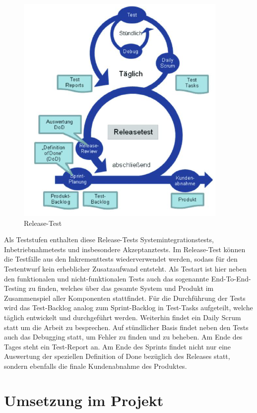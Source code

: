 \begin{figure}[!htb]
    \centering
    \includegraphics[width=.8\textwidth]{figures/rebecca/Release_Test.png}
    \caption[]{Release-Test}
    \label{fig:ReleaseTest}
\end{figure}

Als Teststufen enthalten diese Release-Tests Systemintegrationstests, Inbetriebnahmetests und insbesondere Akzeptanztests. Im Release-Test können die Testfälle aus den Inkrementtests wiederverwendet werden, sodass für den Testentwurf kein erheblicher Zusatzaufwand entsteht. Als Testart ist hier neben den funktionalen und nicht-funktionalen Tests auch das sogenannte End-To-End-Testing zu finden, welches über das gesamte System und Produkt im Zusammenspiel aller Komponenten stattfindet. Für die Durchführung der Tests wird das Test-Backlog analog zum Sprint-Backlog in Test-Tasks aufgeteilt, welche täglich entwickelt und durchgeführt werden. Weiterhin findet ein Daily Scrum statt um die Arbeit zu besprechen. Auf stündlicher Basis findet neben den Tests auch das Debugging statt, um Fehler zu finden und zu beheben. Am Ende des Tages steht ein Test-Report an. Am Ende des Sprints findet nicht nur eine Auswertung der speziellen Definition of Done bezüglich des Releases statt, sondern ebenfalls die finale Kundenabnahme des Produktes.


\section{Umsetzung im Projekt}
\label{sec:UmsetzungTest}

